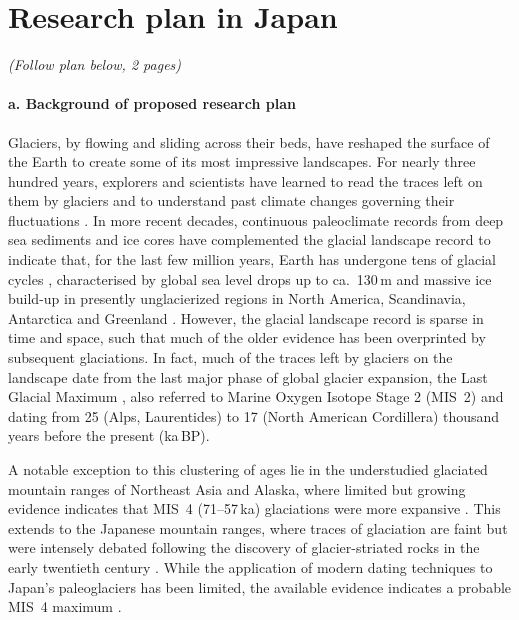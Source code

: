 \documentclass{article}
\begin{document}
\section{Research plan in Japan}

    \emph{(Follow plan below, 2 pages)}

\paragraph{a. Background of proposed research plan}

    Glaciers, by flowing and sliding across their beds, have reshaped the
    surface of the Earth to create some of its most impressive landscapes. For
    nearly three hundred years, explorers and scientists have learned to read
    the traces left on them by glaciers and to understand past climate
    changes governing their fluctuations \citep[e.g.,][]{Venetz.1821}.
    In more recent decades, continuous paleoclimate records from deep sea
    sediments and ice cores have complemented the glacial landscape record to
    indicate that, for the last few million years, Earth has undergone tens of
    glacial cycles \citep{Lisiecki.Raymo.2005}, characterised by global sea
    level drops up to ca.~130\,m and massive ice build-up in presently
    unglacierized regions in North America, Scandinavia, Antarctica and
    Greenland \citep{Ehlers.etal.2011}.
    However, the glacial landscape record is sparse in time and space, such
    that much of the older evidence has been overprinted by subsequent
    glaciations.  In fact, much of the traces left by glaciers on the landscape
    date from the last major phase of global glacier expansion, the Last
    Glacial Maximum \citep[LGM,][]{Heyman.etal.2011}, also referred to Marine
    Oxygen Isotope Stage 2 (MIS~2) and dating from 25 (Alps, Laurentides) to 17
    (North American Cordillera) thousand years before the present (ka\,BP).

    A notable exception to this clustering of ages lie in the understudied
    glaciated mountain ranges of Northeast Asia and Alaska, where limited but
    growing evidence indicates that MIS~4 (71--57\,ka) glaciations were more
    expansive \citep{Batchelor.etal.2019}. This extends to the Japanese
    mountain ranges, where traces of glaciation are faint but were intensely
    debated following the discovery of glacier-striated rocks in the early
    twentieth century \citep{Yamazaki.1902}. While the application of modern
    dating techniques to Japan's paleoglaciers has been limited, the available
    evidence indicates a probable MIS~4 maximum \citep{Sawagaki.Aoki.2011}.
\end{document}
